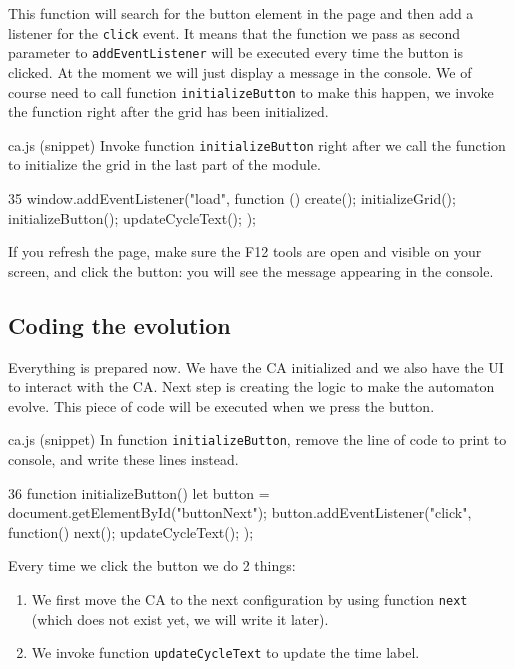This function will search for the button element in the page and then add a listener for the \texttt{click}
event. It means that the function we pass as second parameter to \texttt{addEventListener} will be executed
every time the button is clicked. At the  moment we will just display a message in the console. We
of course need to call function \texttt{initializeButton} to make this happen, we invoke the function
right after the grid has been initialized.

\begin{programcode}{ca.js (snippet)}
Invoke function \texttt{initializeButton} right after we call the function to initialize the grid in
the last part of the module.
\begin{codeh1}{3}{5}
window.addEventListener("load", function () {
  create();
  initializeGrid();
  initializeButton();
  updateCycleText();
});
\end{codeh1}
\end{programcode}

If you refresh the page, make sure the F12 tools are open and visible on your screen, and click the button:
you will see the message appearing in the console.

\subsection{Coding the evolution}
Everything is prepared now. We have the CA initialized and we also have the UI to interact with the CA.
Next step is creating the logic to make the automaton evolve.
This piece of code will be executed when we press the button.

\begin{programcode}{ca.js (snippet)}
In function \texttt{initializeButton}, remove the line of code to print to console, and write these lines
instead.
\begin{codeh1}{3}{6}
function initializeButton() {
  let button = document.getElementById("buttonNext");
  button.addEventListener("click", function(){
    next();
    updateCycleText();
  });
}
\end{codeh1}
\end{programcode}

Every time we click the button we do 2 things:

\begin{enumerate}
\item We first move the CA to the next configuration by using
function \texttt{next} (which does not exist yet, we will write it later).
\item We invoke function \texttt{updateCycleText} to update the time label.
\end{enumerate}

